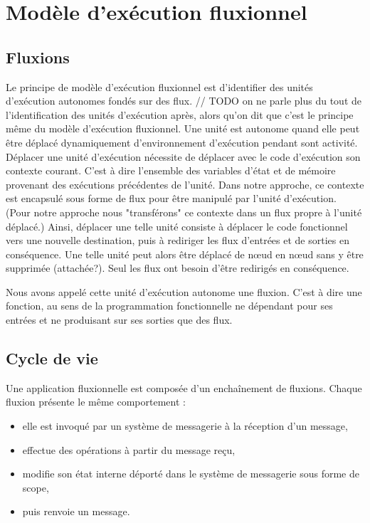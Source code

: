 \section{Modèle d'exécution fluxionnel}

	\subsection{Fluxions}

	Le principe de modèle d'exécution fluxionnel est d'identifier des unités d'exécution autonomes fondés sur des flux.
	// TODO on ne parle plus du tout de l'identification des unités d'exécution après, alors qu'on dit que c'est le principe même du modèle d'exécution fluxionnel.
	Une unité est autonome quand elle peut être déplacé dynamiquement d'environnement d'exécution pendant sont activité.
	Déplacer une unité d'exécution nécessite de déplacer avec le code d'exécution son contexte courant. C'est à dire l'ensemble des variables d'état et de mémoire provenant des exécutions précédentes de l'unité.
	Dans notre approche, ce contexte est encapsulé sous forme de flux pour être manipulé par l'unité d'exécution.
	(Pour notre approche nous "transférons" ce contexte dans un flux propre à l'unité déplacé.)
	Ainsi, déplacer une telle unité consiste à déplacer le code fonctionnel vers une nouvelle destination, puis à rediriger les flux d'entrées et de sorties en conséquence. Une telle unité peut alors être déplacé de nœud en nœud sans y être supprimée (attachée?).
	Seul les flux ont besoin d'être redirigés en conséquence.

	Nous avons appelé cette unité d'exécution autonome une fluxion. C'est à dire une fonction, au sens de la programmation fonctionnelle ne dépendant pour ses entrées et ne produisant sur ses sorties que des flux.

	\subsection{Cycle de vie}

		Une application fluxionnelle est composée d'un enchaînement de fluxions.
		Chaque fluxion présente le même comportement : 
		\begin{itemize}
			\item elle est invoqué par un système de messagerie à la réception d'un message,
			\item effectue des opérations à partir du message reçu,
			\item modifie son état interne déporté dans le système de messagerie sous forme de scope,
			\item  puis renvoie un message.
		\end{itemize}

